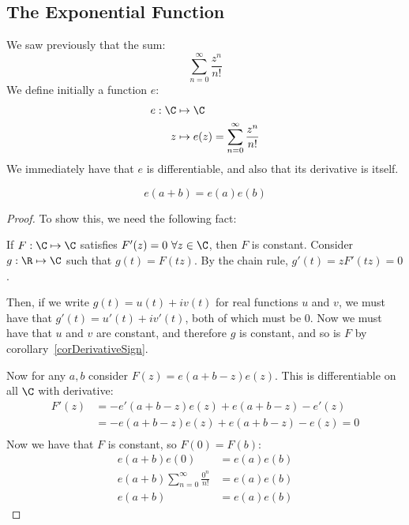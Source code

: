 \documentclass[../Main.tex]{subfiles}
\begin{document}
\subsection{The Exponential Function}
We saw previously that the sum:
\begin{equation*}
    \sum_{n = 0}^\infty \frac{z^n}{n!}
\end{equation*}
We define initially a function $e$:
\begin{align*}
    e : \C &\mapsto \C \\
    z &\mapsto e(z) = \sum_{n = 0}^\infty \frac{z^n}{n!}
\end{align*}
We immediately have that $e$ is differentiable, and also that its derivative is itself.
\begin{proposition}
    \begin{equation*}
        e(a + b) = e(a) e(b)
    \end{equation*}
    \label{propExpAdditivity}
\end{proposition}
\begin{proof}
    To show this, we need the following fact:\par
    \begin{subproof}{If $F : \C \mapsto \C$ satisfies $F'(z) = 0~\forall z \in \C$, then $F$ is constant.}
        Consider $g : \R \mapsto \C$ such that $g(t) = F(tz)$. By the chain rule, $g'(t) = zF'(tz) = 0$.\par
        Then, if we write $g(t) = u(t) + iv(t)$ for real functions $u$ and $v$, we must have that $g'(t) = u'(t) + iv'(t)$, both of which must be 0. Now we must have that $u$ and $v$ are constant, and therefore $g$ is constant, and so is $F$ by corollary~\ref{corDerivativeSign}.
    \end{subproof}
    Now for any $a, b$ consider $F(z) = e(a + b - z) e(z)$. This is differentiable on all $\C$ with derivative:
    \begin{align*}
        F'(z) &= -e'(a + b - z) e(z) + e(a + b - z) - e'(z) \\
        &= -e(a + b - z) e(z) + e(a + b - z) - e(z) = 0\\
    \end{align*}
    Now we have that $F$ is constant, so $F(0) = F(b)$:
    \begin{align*}
        e(a + b) e(0) &= e(a) e(b) \\
        e(a + b) \sum_{n = 0}^\infty \frac{0^n}{n!} &= e(a) e(b) \\
        e(a + b) &= e(a) e(b)
    \end{align*}
\end{proof}
\end{document}
